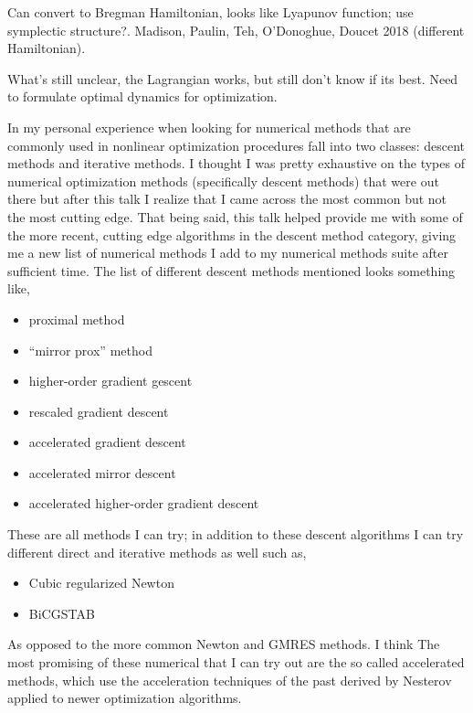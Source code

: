\begin{description}
{\begin{description}
Can convert to Bregman Hamiltonian, looks like Lyapunov function; use symplectic
structure?. Madison, Paulin, Teh, O'Donoghue, Doucet 2018 (different Hamiltonian).

What's still unclear, the Lagrangian works, but still don't know if its best.
Need to formulate optimal dynamics for optimization.

\item[Takeaways from Wibisono Talk]
In my personal experience when looking for numerical methods
that are commonly used in nonlinear optimization procedures fall
into two classes: descent methods and iterative methods. I thought I
was pretty exhaustive on the types of numerical optimization methods
(specifically descent methods) that were out there but after this talk
I realize that I came across the most common but not the most cutting
edge. That being said, this talk
helped provide me with some of the more recent, cutting edge algorithms
in the descent method category, giving me a new list of numerical methods
I add to my numerical methods suite after sufficient time.
The list of different descent methods mentioned looks something like,

\begin{itemize}
\item proximal method
\item ``mirror prox'' method
\item higher-order gradient gescent
\item rescaled gradient descent
\item accelerated gradient descent
\item accelerated mirror descent
\item accelerated higher-order gradient descent
\end{itemize}

These are all methods I can try; in addition to these descent
algorithms I can try different direct and iterative methods as well such as,

\begin{itemize}
\item Cubic regularized Newton
\item BiCGSTAB
\end{itemize}

As opposed to the more common Newton and GMRES methods. I think
The most promising of these numerical that I can try out are the
so called accelerated methods, which use the acceleration techniques
of the past derived by Nesterov
applied to newer optimization algorithms.


\end{description}}
\end{description}
